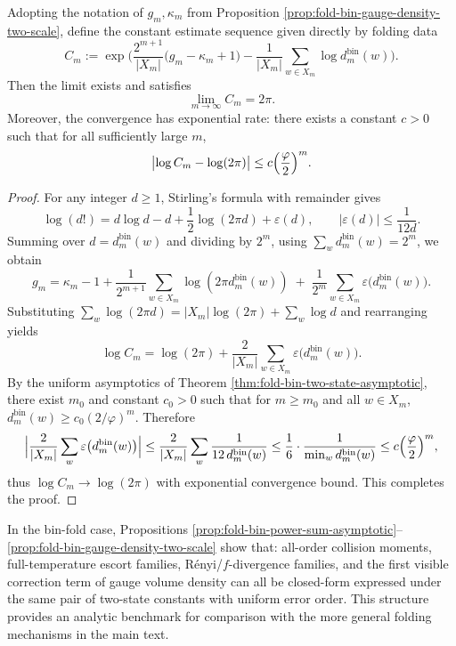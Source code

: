 \begin{corollary}\label{cor:fold-bin-recover-2pi}
Adopting the notation of \(g_m,\kappa_m\) from Proposition \ref{prop:fold-bin-gauge-density-two-scale},
define the constant estimate sequence given directly by folding data
\[
C_m
:=\exp\!\Biggl(
\frac{2^{m+1}}{|X_m|}\bigl(g_m-\kappa_m+1\bigr)
-\frac{1}{|X_m|}\sum_{w\in X_m}\log d^{\mathrm{bin}}_m(w)
\Biggr).
\]
Then the limit exists and satisfies
\[
\lim_{m\to\infty}C_m=2\pi.
\]
Moreover, the convergence has exponential rate: there exists a constant \(c>0\) such that for all sufficiently large \(m\),
\[
\bigl|\log C_m-\log(2\pi)\bigr|\le c\Bigl(\frac{\varphi}{2}\Bigr)^m.
\]
\end{corollary}
\begin{proof}
For any integer \(d\ge 1\), Stirling's formula with remainder gives
\[
\log(d!)=d\log d-d+\frac12\log(2\pi d)+\varepsilon(d),
\qquad |\varepsilon(d)|\le \frac{1}{12d}.
\]
Summing over \(d=d^{\mathrm{bin}}_m(w)\) and dividing by \(2^m\), using \(\sum_w d^{\mathrm{bin}}_m(w)=2^m\), we obtain
\[
g_m
=\kappa_m-1+\frac{1}{2^{m+1}}\sum_{w\in X_m}\log(2\pi d^{\mathrm{bin}}_m(w))
\;+\;\frac{1}{2^m}\sum_{w\in X_m}\varepsilon\bigl(d^{\mathrm{bin}}_m(w)\bigr).
\]
Substituting
\(
\sum_w \log(2\pi d)=|X_m|\log(2\pi)+\sum_w \log d
\)
and rearranging yields
\[
\log C_m=\log(2\pi)+\frac{2}{|X_m|}\sum_{w\in X_m}\varepsilon\bigl(d^{\mathrm{bin}}_m(w)\bigr).
\]
By the uniform asymptotics of Theorem \ref{thm:fold-bin-two-state-asymptotic}, there exist \(m_0\) and constant \(c_0>0\) such that for \(m\ge m_0\) and all \(w\in X_m\),
\(
d^{\mathrm{bin}}_m(w)\ge c_0(2/\varphi)^m
\).
Therefore
\[
\Bigl|\frac{2}{|X_m|}\sum_{w}\varepsilon\bigl(d^{\mathrm{bin}}_m(w)\bigr)\Bigr|
\le \frac{2}{|X_m|}\sum_{w}\frac{1}{12\,d^{\mathrm{bin}}_m(w)}
\le \frac{1}{6}\cdot \frac{1}{\min_w d^{\mathrm{bin}}_m(w)}
\le c\Bigl(\frac{\varphi}{2}\Bigr)^m,
\]
thus \(\log C_m\to\log(2\pi)\) with exponential convergence bound. This completes the proof.
\end{proof}



\begin{remark}\label{rem:fold-bin-solvable-model}
In the bin-fold case, Propositions \ref{prop:fold-bin-power-sum-asymptotic}--\ref{prop:fold-bin-gauge-density-two-scale} show that: all-order collision moments, full-temperature escort families, Rényi/\(f\)-divergence families, and the first visible correction term of gauge volume density can all be closed-form expressed under the same pair of two-state constants with uniform error order.
This structure provides an analytic benchmark for comparison with the more general folding mechanisms in the main text.
\end{remark}
